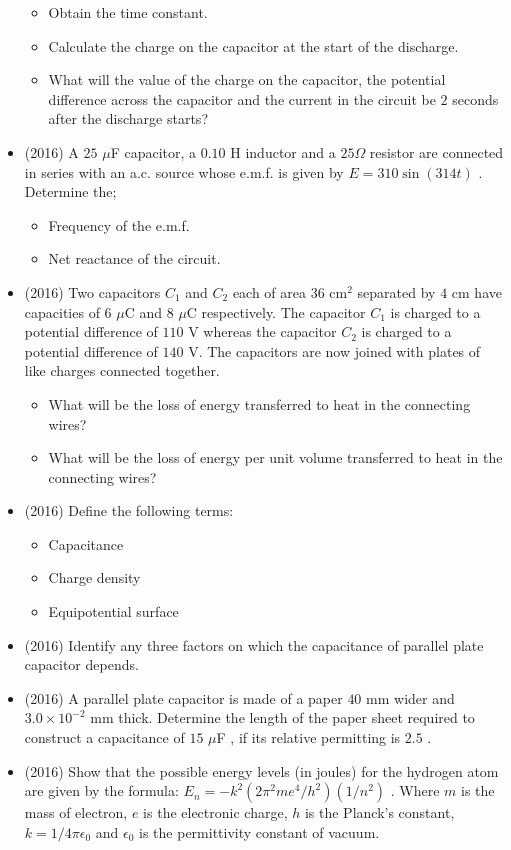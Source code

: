 \documentclass{article}
\begin{document}
\begin{itemize}
\begin{itemize}
\item Obtain the time constant.
\item Calculate the charge on the capacitor at the start of the discharge.
\item What will the value of the charge on the capacitor, the potential difference across the capacitor and the current in the circuit be $ 2$ seconds after the discharge starts?
\end{itemize}
\item (2016)  A $ 25$ $\mu$F capacitor, a $ 0.10$ H inductor and a $ 25\Omega $ resistor are connected in series with an a.c. source whose e.m.f. is given by $ E=310 \sin(314t)$ .  Determine the;\begin{itemize}
\item Frequency of the e.m.f.
\item Net reactance of the circuit.
\end{itemize}
\item (2016)  Two capacitors $ C_{1}$ and $ C_{2}$ each of area $ 36$ cm$ ^{2}$ separated by $ 4$ cm have capacities of $ 6$ $\mu$C and $ 8$ $\mu$C respectively.  The capacitor $ C_{1}$ is charged to a potential difference of $ 110$ V whereas the capacitor $ C_{2}$ is charged to a potential difference of $ 140$ V.  The capacitors are now joined with plates of like charges connected together.\begin{itemize}
\item What will be the loss of energy transferred to heat in the connecting wires?
\item What will be the loss of energy per unit volume transferred to heat in the connecting wires?
\end{itemize}
\item (2016)  Define the following terms:\begin{itemize}
\item Capacitance
\item Charge density
\item Equipotential surface
\end{itemize}
\item (2016)  Identify any three factors on which the capacitance of parallel plate capacitor depends.
\item (2016)  A parallel plate capacitor is made of a paper $ 40$ mm wider and $ 3.0 \times 10^{-2}$ mm thick.  Determine the length of the paper sheet required to construct a capacitance of $ 15$ $\mu$F , if its relative permitting is $ 2.5$ .
\item (2016)  Show that the possible energy levels (in joules) for the hydrogen atom are given by the formula: $ E_{n}=-k^{2}(2\pi^{2}me^{4}/h^{2})(1/n^{2})$ .  Where $ m$ is the mass of electron, $ e$ is the electronic charge, $ h$ is the Planck’s constant, $ k=1/4\pi\epsilon _{0}$ and $ \epsilon _{0}$ is the permittivity constant of vacuum.  \begin{itemize}

\end{itemize}
\end{itemize}
\end{document}
